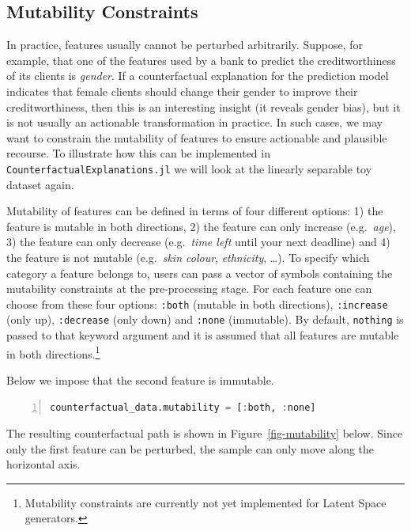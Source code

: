 \documentclass{juliacon}
\begin{document}
\hypertarget{mutability-constraints}{%
\subsection{Mutability Constraints}\label{mutability-constraints}}

In practice, features usually cannot be perturbed arbitrarily. Suppose,
for example, that one of the features used by a bank to predict the
creditworthiness of its clients is \emph{gender}. If a counterfactual
explanation for the prediction model indicates that female clients
should change their gender to improve their creditworthiness, then this
is an interesting insight (it reveals gender bias), but it is not
usually an actionable transformation in practice. In such cases, we may
want to constrain the mutability of features to ensure actionable and
plausible recourse. To illustrate how this can be implemented in
\texttt{CounterfactualExplanations.jl} we will look at the linearly
separable toy dataset again.

Mutability of features can be defined in terms of four different
options: 1) the feature is mutable in both directions, 2) the feature
can only increase (e.g.~\emph{age}), 3) the feature can only decrease
(e.g.~\emph{time left} until your next deadline) and 4) the feature is
not mutable (e.g.~\emph{skin colour}, \emph{ethnicity}, \ldots). To
specify which category a feature belongs to, users can pass a vector of
symbols containing the mutability constraints at the pre-processing
stage. For each feature one can choose from these four options:
\texttt{:both} (mutable in both directions), \texttt{:increase} (only
up), \texttt{:decrease} (only down) and \texttt{:none} (immutable). By
default, \texttt{nothing} is passed to that keyword argument and it is
assumed that all features are mutable in both directions.\footnote{Mutability
  constraints are currently not yet implemented for Latent Space
  generators.}

Below we impose that the second feature is immutable.

\begin{lstlisting}[language=Julia, escapechar=@, numbers=left, label={lst:mutability}, caption={Adding mutability constraints.}]
counterfactual_data.mutability = [:both, :none]
\end{lstlisting}

The resulting counterfactual path is shown in
Figure~\ref{fig-mutability} below. Since only the first feature can be
perturbed, the sample can only move along the horizontal axis.
\end{document}
